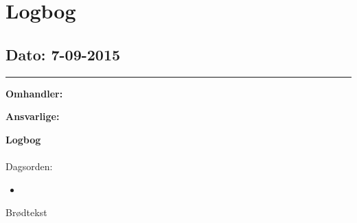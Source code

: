 \chapter{Logbog}

\section{Dato: 7-09-2015 }
\hrule

\textbf{Omhandler:} 

\textbf{Ansvarlige:} 

\textbf{Logbog}
\\
\\
Dagsorden:
\begin{itemize}
	\item 
\end{itemize}

Brødtekst 
